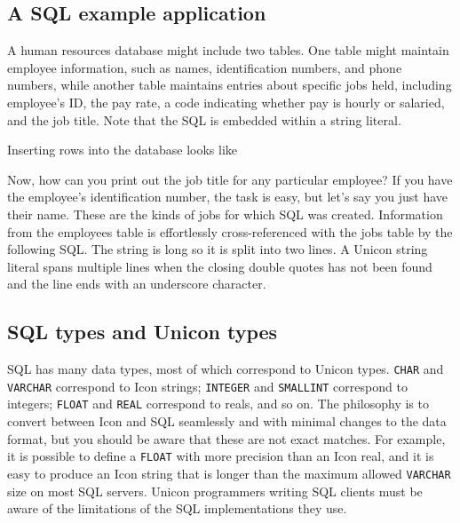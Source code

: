 
\subsection*{A SQL example application}

A human resources database might include two tables. One
table might maintain employee information, such as names,
identification numbers, and phone numbers, while another table
maintains entries about specific jobs held, including
employee's ID, the pay rate, a code indicating whether
pay is hourly or salaried, and the job title. Note that the SQL is
embedded within a string literal.


\noindent
Inserting rows into the database looks like


Now, how can you print out the job title for any particular employee? If
you have the employee's identification number, the
task is easy, but let's say you just have their name.
These are the kinds of jobs for which SQL was created. Information from
the employees table is effortlessly cross-referenced with the jobs
table by the following SQL. The string is long so it is split into
two lines. A Unicon string literal spans multiple lines when the
closing double quotes has not been found and the line ends with an
underscore character.


\subsection*{SQL types and Unicon types}

SQL has many data types, most of which correspond to Unicon types.
\texttt{CHAR} and \texttt{VARCHAR} correspond to Icon
strings; \texttt{INTEGER} and \texttt{SMALLINT} correspond to integers;
\texttt{FLOAT} and \texttt{REAL} correspond to reals, and so on. The
philosophy is to convert between Icon and SQL seamlessly and with
minimal changes to the data format, but you should be aware that these
are not exact matches. For example, it is possible to define a
\texttt{FLOAT} with more precision than an Icon real, and it is easy to
produce an Icon string that is longer than the maximum allowed
\texttt{VARCHAR} size on most SQL servers. Unicon programmers writing
SQL clients must be aware of the limitations of the SQL implementations
they use.


